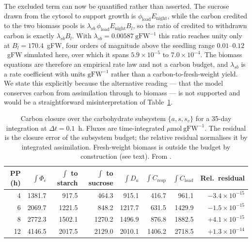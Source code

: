 \documentclass[a4paper,fleqn]{cas-sc}
\begin{document}
The excluded term can now be quantified rather than asserted. The sucrose
drawn from the cytosol to support growth is $\phi_{\text{load}}
E_{\text{night}}$, while the carbon credited to the two biomass pools is
$\lambda_{sb}\,\phi_{\text{load}} E_{\text{night}} B_l$, so the ratio of
credited to withdrawn carbon is exactly $\lambda_{sb} B_l$. With
$\lambda_{sb} = 0.00587\ \mathrm{gFW^{-1}}$ this ratio reaches unity only at
$B_l = 170.4$~gFW, four orders of magnitude above the seedling range
$0.01$--$0.12$~gFW simulated here, over which it spans $5.9\times10^{-5}$ to
$7.0\times10^{-4}$. The biomass equations are therefore an empirical rate law
and not a carbon budget, and $\lambda_{sb}$ is a rate coefficient with units
$\mathrm{gFW^{-1}}$ rather than a carbon-to-fresh-weight yield. We state this
explicitly because the alternative reading --- that the model conserves carbon
from assimilation through to biomass --- is not supported and would be a
straightforward misinterpretation of Table~\ref{tab:carbon_balance}.

\begin{table}[!htbp]
\centering
\small
\caption{Carbon closure over the carbohydrate subsystem $\{a,s,s_v\}$ for a
35-day integration at $\Delta t=0.1$~h. Fluxes are time-integrated
$\mu\mathrm{mol\ gFW^{-1}}$. The residual is the closure error of the
subsystem budget; the relative residual normalises it by integrated
assimilation. Fresh-weight biomass is outside the budget by construction (see
text). From \protect{}.}
\label{tab:carbon_balance}
\begin{tabular}{@{}rrrrrrrr@{}}
\toprule
PP (h) & $\int \Phi_c$ & $\int$ to starch & $\int$ to sucrose & $\int D_a$ & $\int C_{\text{resp}}$ & $\int C_{\text{load}}$ & Rel.\ residual \\
\midrule
4  & 1381.7 & 917.5  & 464.3  & 915.1  & 416.7  & 961.1  & $-3.4\times10^{-15}$ \\
6  & 2069.7 & 1221.5 & 848.2  & 1217.7 & 631.5  & 1429.9 & $-1.5\times10^{-15}$ \\
8  & 2772.3 & 1502.1 & 1270.2 & 1496.9 & 876.8  & 1882.5 & $+4.1\times10^{-15}$ \\
12 & 4146.5 & 2017.5 & 2129.0 & 2010.1 & 1406.2 & 2718.5 & $+1.3\times10^{-14}$ \\
\bottomrule
\end{tabular}
\end{table}
\end{document}
